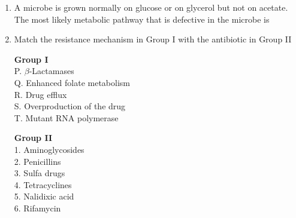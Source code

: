 \documentclass[journal,12pt,onecolumn]{IEEEtran}
\theoremstyle{remark}
\begin{document}
\begin{enumerate}
    \item A microbe is grown normally on glucose or on glycerol but not on acetate. The most likely metabolic pathway that is defective in the microbe is

    \hfill{}

    \begin{enumerate}
    \end{enumerate}

    \item Match the resistance mechanism in Group I with the antibiotic in Group II
    
    \begin{minipage}[t]{0.5\textwidth}
        \textbf{Group I} \\
        P. $\beta$-Lactamases \\
        Q. Enhanced folate metabolism \\
        R. Drug efflux \\
        S. Overproduction of the drug \\
        T. Mutant RNA polymerase
    \end{minipage}%
    \begin{minipage}[t]{0.5\textwidth}
        \textbf{Group II} \\
        1. Aminoglycosides \\
        2. Penicillins \\
        3. Sulfa drugs \\
        4. Tetracyclines \\
        5. Nalidixic acid \\
        6. Rifamycin
    \end{minipage}

    \hfill{}

    \begin{enumerate}
    \end{enumerate}


\end{enumerate}
\end{document}
